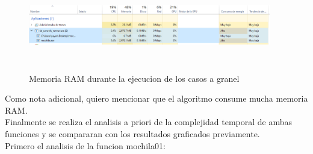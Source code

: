 \documentclass[spanish]{article}
\begin{document}
 		\begin{figure}[H]
 			\centering
 			\includegraphics[width=400px,height=150px]{memoria}
 			\caption{Memoria RAM durante la ejecucion de los casos a granel}
 		\end{figure}
 		Como nota adicional, quiero mencionar que el algoritmo consume mucha memoria RAM.\\ 		
 		Finalmente se realiza el analisis a priori de la complejidad temporal de ambas funciones y se compararan con los resultados graficados previamente.\\
 		Primero el analisis de la funcion mochila01:\\
\end{document}
